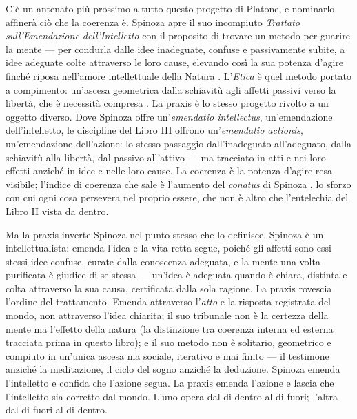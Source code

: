 C'\`e un antenato pi\`u prossimo a tutto questo progetto di Platone, e nominarlo
affiner\`a ci\`o che la coerenza \`e. Spinoza apre il suo incompiuto
\emph{Trattato sull'Emendazione dell'Intelletto} con il proposito di trovare un
metodo per guarire la mente --- per condurla dalle idee inadeguate, confuse e
passivamente subite, a idee adeguate colte attraverso le loro cause, elevando
cos\`i la sua potenza d'agire finch\'e riposa nell'amore intellettuale della
Natura \parencite{spinoza1985emendation}. L'\emph{Etica} \`e quel metodo portato a
compimento: un'ascesa geometrica dalla schiavit\`u agli affetti passivi verso la
libert\`a, che \`e necessit\`a compresa \parencite[V.P42]{spinoza1994ethics}. La
praxis \`e lo stesso progetto rivolto a un oggetto diverso. Dove Spinoza offre
un'\emph{emendatio intellectus}, un'emendazione dell'intelletto, le discipline del
Libro III offrono un'\emph{emendatio actionis}, un'emendazione dell'azione: lo
stesso passaggio dall'inadeguato all'adeguato, dalla schiavit\`u alla libert\`a,
dal passivo all'attivo --- ma tracciato in atti e nei loro effetti anzich\'e in
idee e nelle loro cause. La coerenza \`e la potenza d'agire resa visibile;
l'indice di coerenza che sale \`e l'aumento del \emph{conatus} di Spinoza
\parencite[III.P6--P7]{spinoza1994ethics}, lo sforzo con cui ogni cosa persevera
nel proprio essere, che non \`e altro che l'entelechia del Libro II vista da
dentro.

Ma la praxis inverte Spinoza nel punto stesso che lo definisce. Spinoza \`e un
intellettualista: emenda l'idea e la vita retta segue, poich\'e gli affetti sono
essi stessi idee confuse, curate dalla conoscenza adeguata, e la mente una volta
purificata \`e giudice di se stessa --- un'idea \`e adeguata quando \`e chiara,
distinta e colta attraverso la sua causa, certificata dalla sola ragione. La
praxis rovescia l'ordine del trattamento. Emenda attraverso l'\emph{atto} e la
risposta registrata del mondo, non attraverso l'idea chiarita; il suo tribunale
non \`e la certezza della mente ma l'effetto della natura (la distinzione tra
coerenza interna ed esterna tracciata prima in questo libro); e il suo metodo non
\`e solitario, geometrico e compiuto in un'unica ascesa ma sociale, iterativo e mai
finito --- il testimone anzich\'e la meditazione, il ciclo del sogno anzich\'e la
deduzione. Spinoza emenda l'intelletto e confida che l'azione segua. La praxis
emenda l'azione e lascia che l'intelletto sia corretto dal mondo. L'uno opera dal
di dentro al di fuori; l'altra dal di fuori al di dentro.

